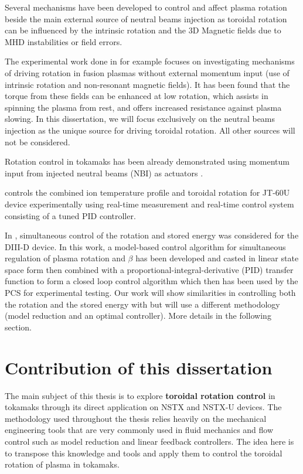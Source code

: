 \documentclass[12pt,lot, lof]{puthesis}
\begin{document}
Several mechanisms have been developed to control and affect plasma rotation beside the main external source of neutral beams injection as toroidal rotation can be influenced by the intrinsic rotation and the 3D Magnetic fields due to MHD instabilities or field errors.

The experimental work done in \cite{Solomon10} for example focuses on investigating mechanisms of driving rotation in fusion plasmas without external momentum input (use of intrinsic rotation and non-resonant magnetic fields). It has been found that the torque from these fields can be enhanced at low rotation, which assists in spinning the plasma from rest, and offers increased resistance against plasma slowing.
In this dissertation, we will focus exclusively on the neutral beams injection as the unique source for driving toroidal rotation. All other sources will not be considered.

Rotation control in tokamaks has been already demonstrated using momentum input from injected neutral beams (NBI) as actuators \cite{Scoville07, Yoshida09}.

\cite{Yoshida09} controls the combined ion temperature profile and toroidal rotation for JT-60U device experimentally using real-time measurement and real-time control system consisting of a tuned PID controller.

In \cite{Scoville07}, simultaneous control of the rotation and stored energy was considered for the DIII-D device. In this work,  a model-based control algorithm for simultaneous regulation of plasma rotation and $\beta$ has been developed and casted in linear state space form then combined with a proportional-integral-derivative (PID) transfer function to form a closed loop control algorithm which then has been used by the PCS for experimental testing. Our work will show similarities in controlling both the rotation and the stored energy with \cite{Scoville07} but will use a different methodology (model reduction and an optimal controller). More details in the following section.

\section{Contribution of this dissertation}

The main subject of this thesis is to explore {\bf{toroidal rotation control}}  in tokamaks through its direct application on NSTX and NSTX-U devices. 
The methodology used throughout the thesis relies heavily on the mechanical engineering tools that are very commonly used in fluid mechanics and flow control such as model reduction and linear feedback controllers. The idea here is to transpose this knowledge and tools and apply them to control the toroidal rotation of plasma in tokamaks. 
\end{document}
